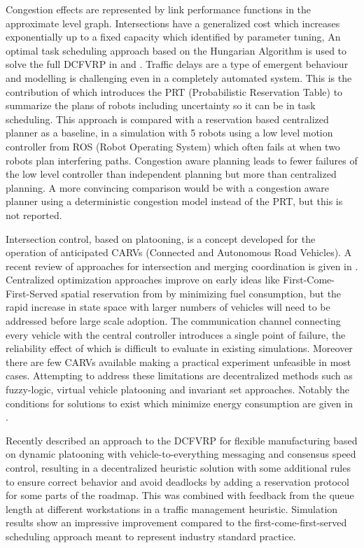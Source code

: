 Congestion effects are represented by link performance functions in the approximate level graph. Intersections have a generalized cost which increases exponentially up to a fixed capacity which identified by parameter tuning, An optimal task scheduling approach based on the Hungarian Algorithm is used to solve the full DCFVRP in \cite{Sabattini2015a} and \cite{Sabattini2018}. Traffic delays are a type of emergent behaviour and modelling is challenging even in a completely automated system. This is the contribution of \cite{Street2020} which introduces the PRT (Probabilistic Reservation Table) to summarize the plans of robots including uncertainty so it can be in task scheduling. This approach is compared with a reservation based centralized planner as a baseline, in a simulation with 5 robots using a low level motion controller from ROS (Robot Operating System) which often fails at when two robots plan interfering paths. Congestion aware planning leads to fewer failures of the low level controller than independent planning but more than centralized planning. A more convincing comparison would be with a congestion aware planner using a deterministic congestion model instead of the PRT, but this is not reported.

Intersection control, based on platooning, is a concept developed for the operation of anticipated CARVs (Connected and Autonomous Road Vehicles). A recent review of approaches for intersection and merging coordination is given in \cite{Rios-Torres2017}. Centralized optimization approaches improve on early ideas like First-Come-First-Served spatial reservation from \cite{Dresner2008} by minimizing fuel consumption, but the rapid increase in state space with larger numbers of vehicles will need to be addressed before large scale adoption. The communication channel connecting every vehicle with the central controller introduces a single point of failure, the reliability effect of which is difficult to evaluate in existing simulations. Moreover there are few CARVs available making a practical experiment unfeasible in most cases. Attempting to address these limitations are decentralized methods such as fuzzy-logic, virtual vehicle platooning and invariant set approaches. Notably the conditions for solutions to exist which minimize energy consumption are given in \cite{Malikopoulos2018}.

Recently \cite{Tadano2019} described an approach to the DCFVRP for flexible manufacturing based on dynamic platooning with vehicle-to-everything messaging and consensus speed control, resulting in a decentralized heuristic solution with some additional rules to ensure correct behavior and avoid deadlocks by adding a reservation protocol for some parts of the roadmap. This was combined with feedback from the queue length at different workstations in a traffic management heuristic. Simulation results show an impressive improvement compared to the first-come-first-served scheduling approach meant to represent industry standard practice.   

